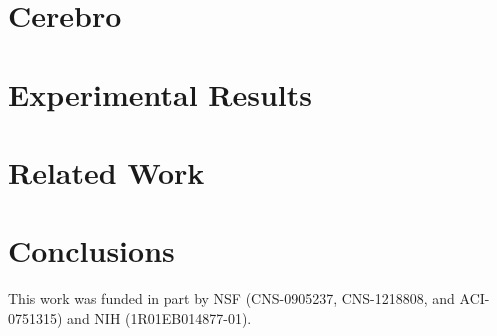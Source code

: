 \documentclass[preprint,10pt]{sigplanconf}
\begin{document}
\section{Cerebro}
\label{sec:design}
%


%

\section{Experimental Results}
\label{sec:results}


\section{Related Work}
\label{sec:related_work}


\section{Conclusions}
\label{sec:conclusions}




\acks

This work was funded in part by NSF (CNS-0905237, CNS-1218808, and ACI-0751315) and NIH
(1R01EB014877-01).







\end{document}

